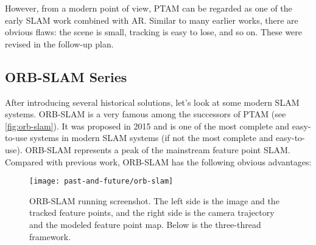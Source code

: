 However, from a modern point of view, PTAM can be regarded as one of the early SLAM work combined with AR. Similar to many earlier works, there are obvious flaws: the scene is small, tracking is easy to lose, and so on. These were revised in the follow-up plan.

\subsection{ORB-SLAM Series} 
After introducing several historical solutions, let's look at some modern SLAM systems. ORB-SLAM is a very famous \textsuperscript{\cite{Mur-Artal2015}} among the successors of PTAM (see \autoref{fig:orb-slam}). It was proposed in 2015 and is one of the most complete and easy-to-use systems in modern SLAM systems (if not the most complete and easy-to-use). ORB-SLAM represents a peak of the mainstream feature point SLAM. Compared with previous work, ORB-SLAM has the following obvious advantages:

\begin{figure}[!ht]
	\centering
	\texttt{[image: past-and-future/orb-slam]}
	\caption{ORB-SLAM running screenshot. The left side is the image and the tracked feature points, and the right side is the camera trajectory and the modeled feature point map. Below is the  three-thread framework.}
	\label{fig:orb-slam}
\end{figure}


